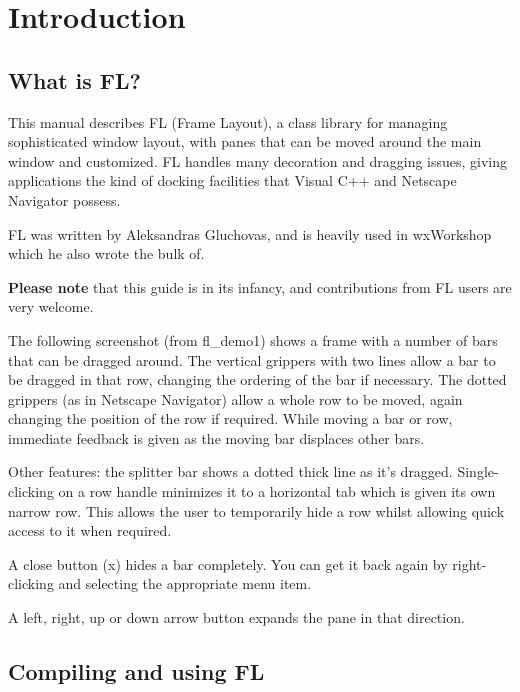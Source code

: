 \chapter{Introduction}\label{introduction}
%
%
\setfooter{\thepage}{}{}{}{}{\thepage}%

\section{What is FL?}\label{whatisfl}

This manual describes FL (Frame Layout), a
class library for managing sophisticated window layout,
with panes that can be moved around the main window
and customized. FL handles many decoration and dragging
issues, giving applications the kind of docking facilities
that Visual C++ and Netscape Navigator possess.

FL was written by Aleksandras Gluchovas, and is heavily used in
wxWorkshop which he also wrote the bulk of.

{\bf Please note} that this guide is in its infancy, and contributions
from FL users are very welcome.

The following screenshot (from fl\_demo1) shows a frame with a number of
bars that can be dragged around. The vertical grippers with
two lines allow a bar to be dragged in that row, changing the
ordering of the bar if necessary.
The dotted grippers (as in Netscape Navigator) allow
a whole row to be moved, again changing the position of the row
if required. While moving a bar or row, immediate feedback
is given as the moving bar displaces other bars.

Other features: the splitter bar shows a dotted thick line as
it's dragged. Single-clicking on a row handle minimizes it to
a horizontal tab which is given its own narrow row. This allows
the user to temporarily hide a row whilst allowing quick access
to it when required.

A close button (x) hides a bar completely. You can get it back again
by right-clicking and selecting the appropriate menu item.

A left, right, up or down arrow button expands the pane in that direction.


\section{Compiling and using FL}


